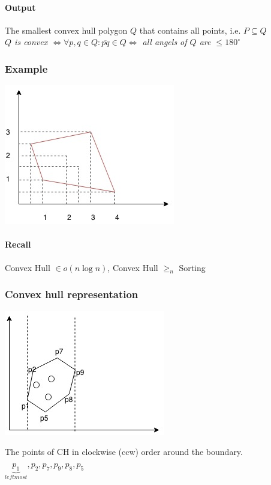 \paragraph{Output} The smallest convex hull polygon $Q$ that contains all points, i.e. $P \subseteq Q$ \\
\textit{$Q$ is convex $\Leftrightarrow \forall p,q \in Q: \overline{pq}\in Q \Leftrightarrow$ all angels of $Q$ are $\leq 180^{\circ}$}
\subsubsection{Example}
\begin{center}
	\includegraphics[scale=1]{img/convex} 
\end{center}
\paragraph{Recall} Convex Hull $\in o(n \log n)$, Convex Hull $\geq_n$ Sorting \\
\subsubsection{Convex hull representation}
\begin{center}
	\includegraphics[scale=0.5]{img/convex1} 
\end{center}
The points of CH in clockwise (ccw) order around the boundary. $\underbrace{p_1}_{leftmost},p_2,p_7,p_9,p_8,p_5$
